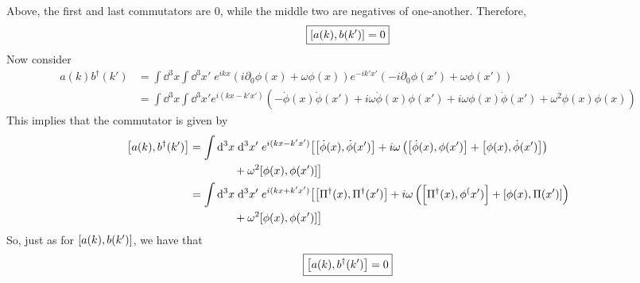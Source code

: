 \documentclass[12pt]{article}
\begin{document}
\begin{enumerate}[label=(\alph*)]
    Above, the first and last commutators are 0, while the middle two are negatives of one-another. Therefore,
    \[ \boxed{\comm{a(k)}{b(k')} = 0} \]
    Now consider
    \begin{align*}
        a(k)b^\dag(k') &= \int\dd^3x\int\dd^3x' \; e^{ikx}\left(i\partial_0\phi(x) + \omega\phi(x)\right)e^{-ik'x'}\left(-i\partial_0\phi(x') + \omega\phi(x')\right) \\
        &= \int\dd^3x\int\dd^3x' e^{i(kx - k'x')}\left(-\dot{\phi}(x)\dot{\phi}(x') + i\omega\dot{\phi}(x)\phi(x') + i\omega\phi(x)\dot{\phi}(x') + \omega^2\phi(x)\phi(x)\right)
    \end{align*}
    This implies that the commutator is given by
    \begin{align*}
        \comm{a(k)}{b^\dag(k')} &= \int\dd^3x\;\dd^3x' \; e^{i(kx - k'x')}\big{[}\comm{\dot{\phi}(x)}{\dot{\phi}(x')} + i\omega\left(\comm{\dot{\phi}(x)}{\phi(x')} + \comm{\phi(x)}{\dot{\phi}(x')}\right) \\
        &\qquad\qquad + \omega^2\comm{\phi(x)}{\phi(x')}\big{]} \\
        &= \int\dd^3x\;\dd^3x' \; e^{i(kx+k'x')}\big{[}\comm{\Pi^\dag(x)}{\Pi^\dag(x')} + i\omega\left(\comm{\Pi^\dag(x)}{\phi^(x')} + \comm{\phi(x)}{\Pi(x')}\right) \\
        &\qquad\qquad + \omega^2\comm{\phi(x)}{\phi(x')}\big{]}
    \end{align*}
    So, just as for $\comm{a(k)}{b(k')}$, we have that
    \[ \boxed{\comm{a(k)}{b^\dag(k')} = 0} \]


\end{enumerate}
\end{document}
